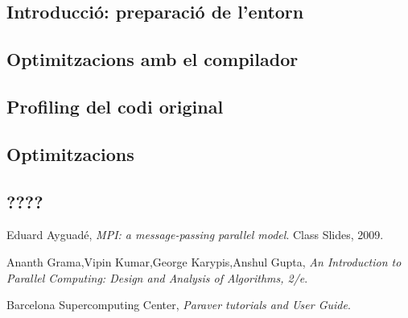 \documentclass[final,a4paper,11pt]{report}
\begin{document}


\tableofcontents
\newpage


\subsection{Introducció: preparació de l'entorn}

\subsection{Optimitzacions amb el compilador}

\subsection{Profiling del codi original}


\subsection{Optimitzacions}


\subsection{????}

\begin{thebibliography}{9}

  Eduard Ayguadé,
  \emph{MPI: a message-passing parallel model}.
  Class Slides,
  2009.

  Ananth Grama,Vipin Kumar,George Karypis,Anshul Gupta,
  \emph{An Introduction to Parallel Computing: Design and Analysis of Algorithms, 2/e}.

  Barcelona Supercomputing Center,
  \emph{Paraver tutorials and User Guide}.

\end{thebibliography}
\end{document}
